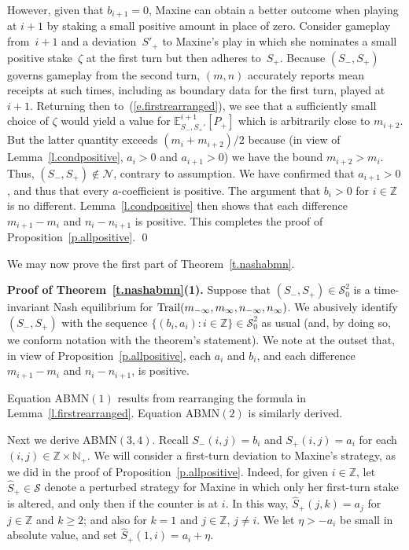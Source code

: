 \documentclass[letterpaper,11pt,oneside,reqno]{amsbook}
\newcommand{\N}{\ensuremath{\mathbb{N}}}
\newcommand{\Z}{\ensuremath{\mathbb{Z}}}
\newcommand{\E}[0]{\mathbb{E}}
\numberwithin{figure}{chapter}
\theoremstyle{definition}
\theoremstyle{definition}
\theoremstyle{definition}
\theoremstyle{definition}
\theoremstyle{definition}
\newcommand{\mc}{\mathcal}
\newcommand{\nwithoutzero}{\N_+}
\newcommand{\game}{{\rm Trail}}
\newcommand{\tis}{\mc{S}_0}
\newcommand{\abmnmac}{\textrm{ABMN}}
\begin{document}
However, given that $b_{i+1} = 0$, Maxine can obtain a better outcome when playing at $i+1$ by staking a small positive amount in place of zero. Consider gameplay from~$i+1$ and a deviation~$S'_+$ to Maxine's play in which she nominates a small positive stake~$\zeta$ at the first turn but then adheres to~$S_+$. Because $(S_-,S_+)$ governs gameplay from the second turn, $(m,n)$ accurately reports mean receipts at such times, including as boundary data for the first turn, played at $i+1$. Returning then to~(\ref{e.firstrearranged}), we see that  
a sufficiently small choice of $\zeta$ would yield a value for $\E^{i+1}_{S_-,S_+'}[P_+]$
which is arbitrarily close to $m_{i+2}$. But the latter quantity exceeds  $(m_i + m_{i+2})/2$ because (in view of Lemma~\ref{l.condpositive}, $a_i > 0$ and $a_{i+1} > 0$) we have the bound $m_{i+2} > m_i$.
Thus, $(S_-,S_+) \not\in \mc{N}$, contrary to assumption. We have confirmed that $a_{i+1} > 0$, and thus that every $a$-coefficient is positive.
The argument that $b_i > 0$ for $i \in \Z$ is no different. Lemma~\ref{l.condpositive} then shows that each difference $m_{i+1} - m_i$ and $n_i - n_{i+1}$ is positive. 
This completes the proof of Proposition~\ref{p.allpositive}. \qed


 



We may now prove the first part of  Theorem~\ref{t.nashabmn}.
 
{\bf Proof of Theorem~\ref{t.nashabmn}(1).}  Suppose  that 
$(S_-,S_+) \in  \tis^2$ is a time-invariant Nash equilibrium for $\game(m_{-\infty},m_\infty,n_{-\infty},n_\infty)$. We abusively identify $(S_-,S_+)$ with the sequence 
 $\big\{ (b_i,a_i): i \in \Z \big\} \in \tis^2$ as usual (and, by doing so, we conform notation with the theorem's statement).
We note at the outset that, in view of Proposition~\ref{p.allpositive}, each $a_i$ and $b_i$, and each difference $m_{i+1} - m_i$ and $n_i - n_{i+1}$, is positive.

Equation \abmnmac$(1)$ results from rearranging the formula in Lemma~\ref{l.firstrearranged}. Equation \abmnmac$(2)$ is similarly derived. 


Next we derive \abmnmac$(3,4)$. Recall $S_-(i,j) = b_i$ and $S_+(i,j)=a_i$ for each $(i,j) \in \Z \times \nwithoutzero$. 
We will consider a first-turn deviation to Maxine's strategy, as we did in the proof of Proposition~\ref{p.allpositive}.
Indeed,
for given $i \in \Z$, let  $\hat{S}_+ \in \mc{S}$ denote a perturbed strategy  for Maxine in which only her first-turn stake is altered, and only then if the counter is at $i$. In this way,  $\hat{S}_+(j,k) = a_j$ for $j \in \Z$ and $k \geq 2$; and also for $k=1$ and $j \in \Z$, $j \not= i$. We let $\eta > -a_i$ be small in absolute value, and set $\hat{S}_+(1,i) = a_i + \eta$.
\end{document}
